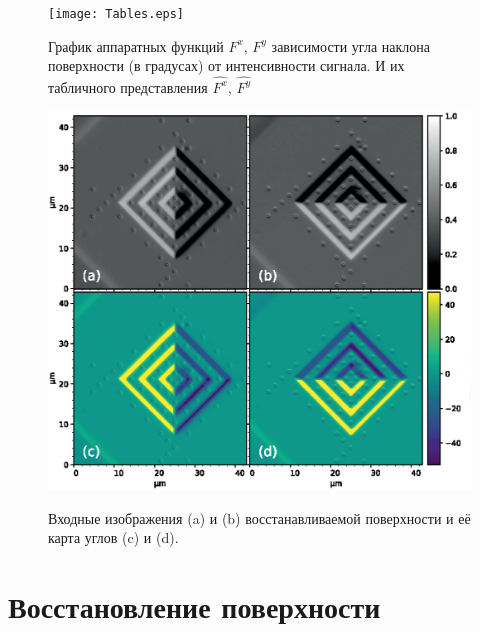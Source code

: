 \documentclass{beamer}
\begin{document}
\begin{frame}[c,allowframebreaks]
    \framebreak

    \begin{figure}
        \texttt{[image: Tables.eps]}
        \caption
        {
            График аппаратных функций $F^x$, $F^y$ зависимости угла наклона поверхности
            (в градусах) от интенсивности сигнала. И их табличного представления
            $\hat{F^x}$, $\hat{F^y}$
        }
        {\label{fig:Tables}}%
    \end{figure}

    \framebreak

    \begin{figure}
        \includegraphics[width=0.5\linewidth]{P.eps}
        \caption{Входные изображения (a) и (b) восстанавливаемой поверхности и её карта углов (c) и (d).}
        {\label{fig:input_data}}%
    \end{figure}
\end{frame}


\section{Восстановление поверхности}
\begin{frame}
    \sectionpage
\end{frame}
\end{document}
